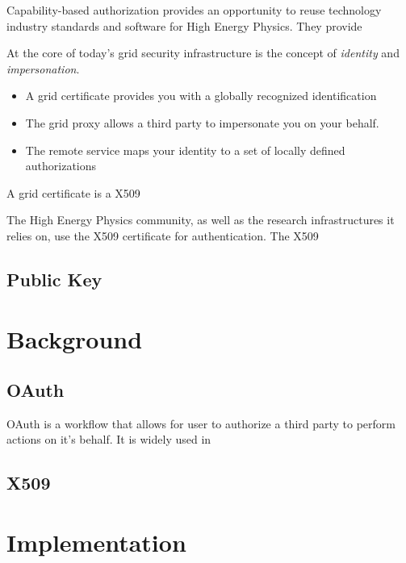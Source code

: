 \documentclass{webofc}
\begin{document}
Capability-based authorization provides an opportunity to reuse technology industry standards and software for High Energy Physics.  They provide 

At the core of today's grid security infrastructure is the concept of \textit{identity} and \textit{impersonation}.

\begin{itemize}
    \item A grid certificate provides you with a globally recognized identification
    \item The grid proxy allows a third party to impersonate you on your behalf.
    \item The remote service maps your identity to a set of locally defined authorizations
\end{itemize}

A grid certificate is a X509 \cite{housley1998internet} 




The High Energy Physics community, as well as the research infrastructures it relies on, use the X509 certificate for authentication.  The X509


\subsection{Public Key}





\section{Background}
\label{background}

\subsection{OAuth}
\label{sec:oauth}

OAuth is a workflow that allows for user to authorize a third party to perform actions on it's behalf.  It is widely used in 


\subsection{X509}
\label{sec:x509}

\section{Implementation}
\label{sec:implementation}
\end{document}
